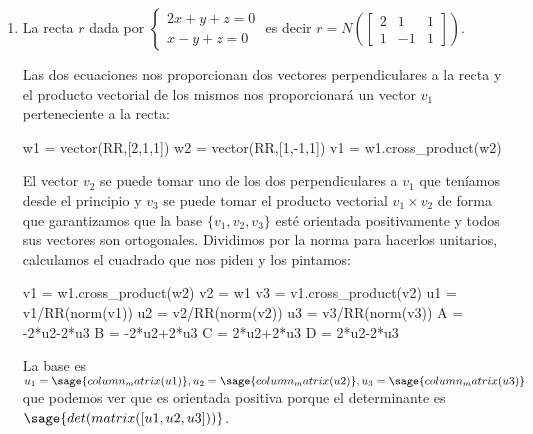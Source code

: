 \documentclass{amsart}
\begin{document}
\begin{enumerate}
\item La recta $r$ dada por 
$
\begin{cases}
2x+y+z = 0 \\
x-y+z = 0
\end{cases}
$ es decir $r = N\left(\left[\begin{array}{ccc} 2 & 1 & 1 \\ 1 & -1 & 1 \end{array} \right]\right)$.

Las dos ecuaciones nos proporcionan dos vectores perpendiculares a la recta y el producto vectorial de los
mismos nos proporcionará un vector $v_1$ perteneciente a la recta:

\begin{sageblock}
w1 = vector(RR,[2,1,1])
w2 = vector(RR,[1,-1,1])
v1 = w1.cross_product(w2)
\end{sageblock}

El vector $v_2$ se puede tomar uno de los dos perpendiculares a $v_1$ que teníamos desde el principio y 
$v_3$ se puede tomar el producto vectorial $v_1 \times v_2$ de forma que garantizamos que la base $\{v_1,v_2,v_3\}$
esté orientada positivamente y todos sus vectores son ortogonales. Dividimos por la norma para hacerlos
unitarios, calculamos el cuadrado que nos piden y los pintamos:

\begin{sageblock}
v1 = w1.cross_product(w2)
v2 = w1
v3 = v1.cross_product(v2)
u1 = v1/RR(norm(v1))
u2 = v2/RR(norm(v2))
u3 = v3/RR(norm(v3))
A = -2*u2-2*u3
B = -2*u2+2*u3
C =  2*u2+2*u3
D =  2*u2-2*u3
\end{sageblock}

La base es $u_1 = \sage{column_matrix(u1)}, u_2 = \sage{column_matrix(u2)},
u_3 = \sage{column_matrix(u3)}$ que podemos ver que es orientada positiva porque
el determinante es $\sage{det(matrix([u1,u2,u3]))}$.

\begin{sagesub}
\begin{center}
\end{center}
\end{sagesub}


\end{enumerate}
\end{document}
